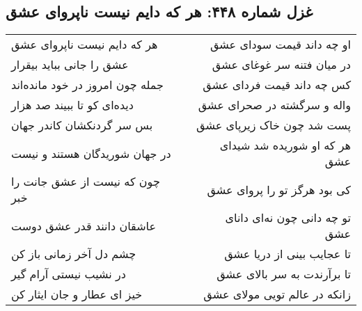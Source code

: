 \begin{center}
\section*{غزل شماره ۴۴۸: هر که دایم نیست ناپروای عشق}
\label{sec:448}
\begin{longtable}{l p{0.5cm} r}
هر که دایم نیست ناپروای عشق
&&
او چه داند قیمت سودای عشق
\\
عشق را جانی بباید بیقرار
&&
در میان فتنه سر غوغای عشق
\\
جمله چون امروز در خود مانده‌اند
&&
کس چه داند قیمت فردای عشق
\\
دیده‌ای کو تا ببیند صد هزار
&&
واله و سرگشته در صحرای عشق
\\
بس سر گردنکشان کاندر جهان
&&
پست شد چون خاک زیرپای عشق
\\
در جهان شوریدگان هستند و نیست
&&
هر که او شوریده شد شیدای عشق
\\
چون که نیست از عشق جانت را خبر
&&
کی بود هرگز تو را پروای عشق
\\
عاشقان دانند قدر عشق دوست
&&
تو چه دانی چون نه‌ای دانای عشق
\\
چشم دل آخر زمانی باز کن
&&
تا عجایب بینی از دریا عشق
\\
در نشیب نیستی آرام گیر
&&
تا برآرندت به سر بالای عشق
\\
خیز ای عطار و جان ایثار کن
&&
زانکه در عالم تویی مولای عشق
\\
\end{longtable}
\end{center}
